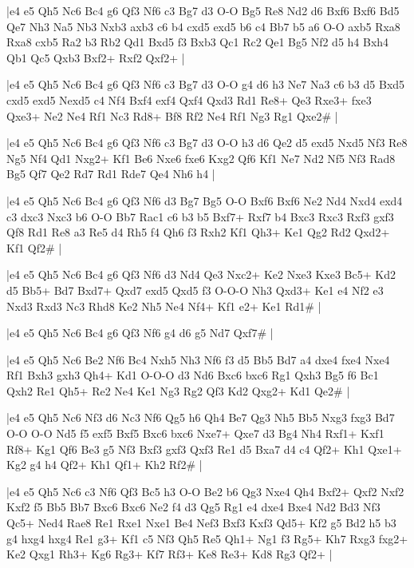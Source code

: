 \whitename{}
\blackname{}
\makegametitle
|e4 e5 Qh5 Nc6 Bc4 g6 Qf3 Nf6 c3 Bg7 d3 O-O Bg5 Re8 Nd2 d6 Bxf6 Bxf6 Bd5 Qe7 Nh3 Na5 Nb3 Nxb3 axb3 c6 b4 cxd5 exd5 b6 c4 Bb7 b5 a6 O-O axb5 Rxa8 Rxa8 cxb5 Ra2 b3 Rb2 Qd1 Bxd5 f3 Bxb3 Qc1 Rc2 Qe1 Bg5 Nf2 d5 h4 Bxh4 Qb1 Qc5 Qxb3 Bxf2+ Rxf2 Qxf2+  |

\whitename{}
\blackname{}
\makegametitle
|e4 e5 Qh5 Nc6 Bc4 g6 Qf3 Nf6 c3 Bg7 d3 O-O g4 d6 h3 Ne7 Na3 c6 b3 d5 Bxd5 cxd5 exd5 Nexd5 c4 Nf4 Bxf4 exf4 Qxf4 Qxd3 Rd1 Re8+ Qe3 Rxe3+ fxe3 Qxe3+ Ne2 Ne4 Rf1 Nc3 Rd8+ Bf8 Rf2 Ne4 Rf1 Ng3 Rg1 Qxe2\#  |

\whitename{}
\blackname{}
\makegametitle
|e4 e5 Qh5 Nc6 Bc4 g6 Qf3 Nf6 c3 Bg7 d3 O-O h3 d6 Qe2 d5 exd5 Nxd5 Nf3 Re8 Ng5 Nf4 Qd1 Nxg2+ Kf1 Be6 Nxe6 fxe6 Kxg2 Qf6 Kf1 Ne7 Nd2 Nf5 Nf3 Rad8 Bg5 Qf7 Qe2 Rd7 Rd1 Rde7 Qe4 Nh6 h4  |

\whitename{}
\blackname{}
\makegametitle
|e4 e5 Qh5 Nc6 Bc4 g6 Qf3 Nf6 d3 Bg7 Bg5 O-O Bxf6 Bxf6 Ne2 Nd4 Nxd4 exd4 c3 dxc3 Nxc3 b6 O-O Bb7 Rac1 c6 b3 b5 Bxf7+ Rxf7 b4 Bxc3 Rxc3 Rxf3 gxf3 Qf8 Rd1 Re8 a3 Re5 d4 Rh5 f4 Qh6 f3 Rxh2 Kf1 Qh3+ Ke1 Qg2 Rd2 Qxd2+ Kf1 Qf2\#  |

\whitename{}
\blackname{}
\makegametitle
|e4 e5 Qh5 Nc6 Bc4 g6 Qf3 Nf6 d3 Nd4 Qe3 Nxc2+ Ke2 Nxe3 Kxe3 Bc5+ Kd2 d5 Bb5+ Bd7 Bxd7+ Qxd7 exd5 Qxd5 f3 O-O-O Nh3 Qxd3+ Ke1 e4 Nf2 e3 Nxd3 Rxd3 Nc3 Rhd8 Ke2 Nh5 Ne4 Nf4+ Kf1 e2+ Ke1 Rd1\#  |

\whitename{}
\blackname{}
\makegametitle
|e4 e5 Qh5 Nc6 Bc4 g6 Qf3 Nf6 g4 d6 g5 Nd7 Qxf7\#  |

\whitename{}
\blackname{}
\makegametitle
|e4 e5 Qh5 Nc6 Be2 Nf6 Bc4 Nxh5 Nh3 Nf6 f3 d5 Bb5 Bd7 a4 dxe4 fxe4 Nxe4 Rf1 Bxh3 gxh3 Qh4+ Kd1 O-O-O d3 Nd6 Bxc6 bxc6 Rg1 Qxh3 Bg5 f6 Bc1 Qxh2 Re1 Qh5+ Re2 Ne4 Ke1 Ng3 Rg2 Qf3 Kd2 Qxg2+ Kd1 Qe2\#  |

\whitename{}
\blackname{}
\makegametitle
|e4 e5 Qh5 Nc6 Nf3 d6 Nc3 Nf6 Qg5 h6 Qh4 Be7 Qg3 Nh5 Bb5 Nxg3 fxg3 Bd7 O-O O-O Nd5 f5 exf5 Bxf5 Bxc6 bxc6 Nxe7+ Qxe7 d3 Bg4 Nh4 Rxf1+ Kxf1 Rf8+ Kg1 Qf6 Be3 g5 Nf3 Bxf3 gxf3 Qxf3 Re1 d5 Bxa7 d4 c4 Qf2+ Kh1 Qxe1+ Kg2 g4 h4 Qf2+ Kh1 Qf1+ Kh2 Rf2\#  |

\whitename{}
\blackname{}
\makegametitle
|e4 e5 Qh5 Nc6 c3 Nf6 Qf3 Bc5 h3 O-O Be2 b6 Qg3 Nxe4 Qh4 Bxf2+ Qxf2 Nxf2 Kxf2 f5 Bb5 Bb7 Bxc6 Bxc6 Ne2 f4 d3 Qg5 Rg1 e4 dxe4 Bxe4 Nd2 Bd3 Nf3 Qc5+ Ned4 Rae8 Re1 Rxe1 Nxe1 Be4 Nef3 Bxf3 Kxf3 Qd5+ Kf2 g5 Bd2 h5 b3 g4 hxg4 hxg4 Re1 g3+ Kf1 c5 Nf3 Qh5 Re5 Qh1+ Ng1 f3 Rg5+ Kh7 Rxg3 fxg2+ Ke2 Qxg1 Rh3+ Kg6 Rg3+ Kf7 Rf3+ Ke8 Re3+ Kd8 Rg3 Qf2+  |

